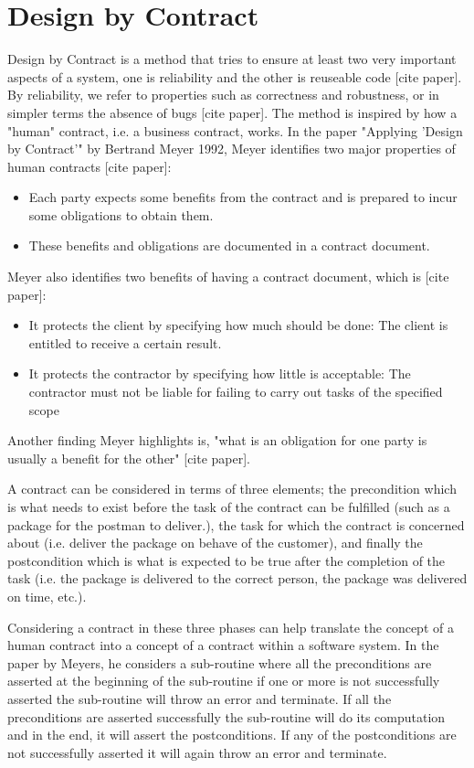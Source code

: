 \section{Design by Contract}

Design by Contract is a method that tries to ensure at least two very important aspects of a system, one is reliability and the other is reuseable code [cite paper].
By reliability, we refer to properties such as correctness and robustness, or in simpler terms the absence of bugs [cite paper].
The method is inspired by how a "human" contract, i.e. a business contract, works.
In the paper "Applying 'Design by Contract'" by Bertrand Meyer 1992, Meyer identifies two major properties of human contracts [cite paper]:
\begin{itemize}
    \item Each party expects some benefits from the contract and is prepared to incur some obligations to obtain them.
    \item These benefits and obligations are documented in a contract document.
\end{itemize}

Meyer also identifies two benefits of having a contract document, which is [cite paper]:
\begin{itemize}
    \item It protects the client by specifying how much should be done: The client is entitled to receive a certain result.
    \item It protects the contractor by specifying how little is acceptable: The contractor must not be liable for failing to carry out tasks of the specified scope
\end{itemize}

Another finding Meyer highlights is, "what is an obligation for one party is usually a benefit for the other" [cite paper].

A contract can be considered in terms of three elements; the precondition which is what needs to exist before the task of the contract can be fulfilled (such as a package for the postman to deliver.), the task for which the contract is concerned about (i.e. deliver the package on behave of the customer), and finally the postcondition which is what is expected to be true after the completion of the task (i.e. the package is delivered to the correct person, the package was delivered on time, etc.).

Considering a contract in these three phases can help translate the concept of a human contract into a concept of a contract within a software system. In the paper by Meyers, he considers a sub-routine where all the preconditions are asserted at the beginning of the sub-routine if one or more is not successfully asserted the sub-routine will throw an error and terminate. If all the preconditions are asserted successfully the sub-routine will do its computation and in the end, it will assert the postconditions. If any of the postconditions are not successfully asserted it will again throw an error and terminate.

